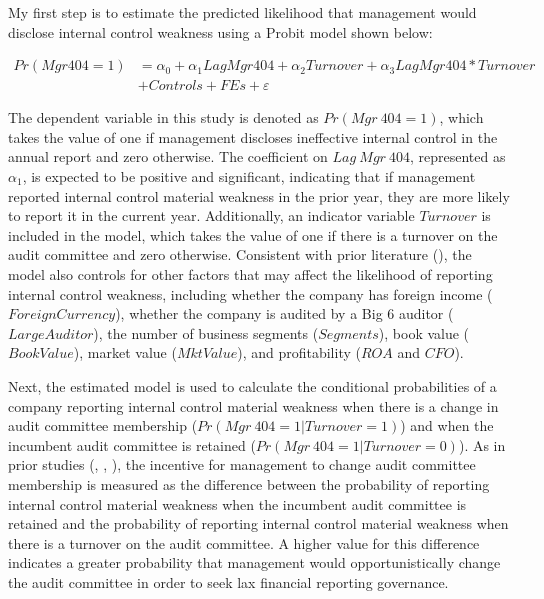 \documentclass[12pt,english]{article}
\begin{document}
My first step is to estimate the predicted likelihood that management would disclose internal control weakness using a Probit model shown below: 

\setlength{\abovedisplayskip}{0pt}
\setlength{\belowdisplayskip}{0pt}
\begin{align*}
Pr(Mgr 404 = 1) &=\alpha_{0} + \alpha_{1}Lag Mgr 404 + \alpha_{2} Turnover + \alpha_{3} Lag Mgr 404*Turnover\\
&+ Controls + FEs + \varepsilon
\end{align*}

The dependent variable in this study is denoted as $Pr(Mgr\ 404 = 1)$, which takes the value of one if management discloses ineffective internal control in the annual report and zero otherwise. The coefficient on $Lag\ Mgr\ 404$, represented as $\alpha_{1}$, is expected to be positive and significant, indicating that if management reported internal control material weakness in the prior year, they are more likely to report it in the current year. Additionally, an indicator variable $Turnover$ is included in the model, which takes the value of one if there is a turnover on the audit committee and zero otherwise. Consistent with prior literature (\citet{gm2005}), the model also controls for other factors that may affect the likelihood of reporting internal control weakness, including whether the company has foreign income ($Foreign Currency$), whether the company is audited by a Big 6 auditor ($Large Auditor$), the number of business segments ($Segments$), book value ($Book Value$), market value ($Mkt Value$), and profitability ($ROA$ and $CFO$).

Next, the estimated model is used to calculate the conditional probabilities of a company reporting internal control material weakness when there is a change in audit committee membership ($Pr(Mgr\ 404 = 1|Turnover = 1)$) and when the incumbent audit committee is retained ($Pr(Mgr\ 404 = 1|Turnover = 0)$). As in prior studies (\citet{lennox2000}, \citet{npww2016}, \citet{aep2021}), the incentive for management to change audit committee membership is measured as the difference between the probability of reporting internal control material weakness when the incumbent audit committee is retained and the probability of reporting internal control material weakness when there is a turnover on the audit committee. A higher value for this difference indicates a greater probability that management would opportunistically change the audit committee in order to seek lax financial reporting governance.
\end{document}
